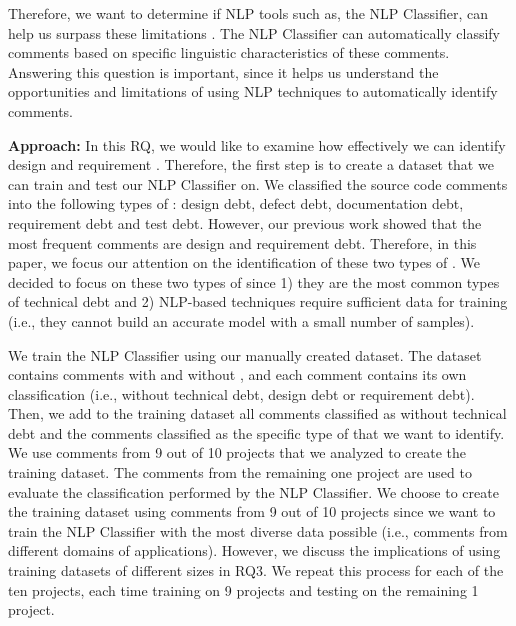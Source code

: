 Therefore, we want to determine if NLP tools such as, the NLP Classifier, can help us surpass these limitations . The NLP Classifier can automatically classify comments based on specific linguistic characteristics of these comments. Answering this question is important, since it helps us understand the opportunities and limitations of using NLP techniques to automatically identify \SATD comments. 

\vspace{1mm}
\noindent \textbf{Approach:} In this RQ, we would like to examine how effectively we can identify design and requirement \SATD. Therefore, the first step is to create a dataset that we can train and test our NLP Classifier on. We classified the source code comments into the following types of \SATD: design debt, defect debt, documentation debt, requirement debt and test debt. However, our previous work showed that the most frequent \SATD comments are design and requirement debt. Therefore, in this paper, we focus our attention on the identification of these two types of \SATD. We decided to focus on these two types of \SATD since 1) they are the most common types of technical debt and 2) NLP-based techniques require sufficient data for training (i.e., they cannot build an accurate model with a small number of samples).

We train the NLP Classifier using our manually created dataset. The dataset contains comments with and without \SATD, and each comment contains its own classification (i.e., without technical debt, design debt or requirement debt). Then, we add to the training dataset all comments classified as without technical debt and the comments classified as the specific type of \SATD that we want to identify. We use comments from 9 out of 10 projects that we analyzed to create the training dataset. The comments from the remaining one project are used to evaluate the classification performed by the NLP Classifier. We choose to create the training dataset using comments from 9 out of 10 projects since we want to train the NLP Classifier with the most diverse data possible (i.e., comments from different domains of applications). However, we discuss the implications of using training datasets of different sizes in RQ3. We repeat this process for each of the ten projects, each time training on 9 projects and testing on the remaining 1 project.

